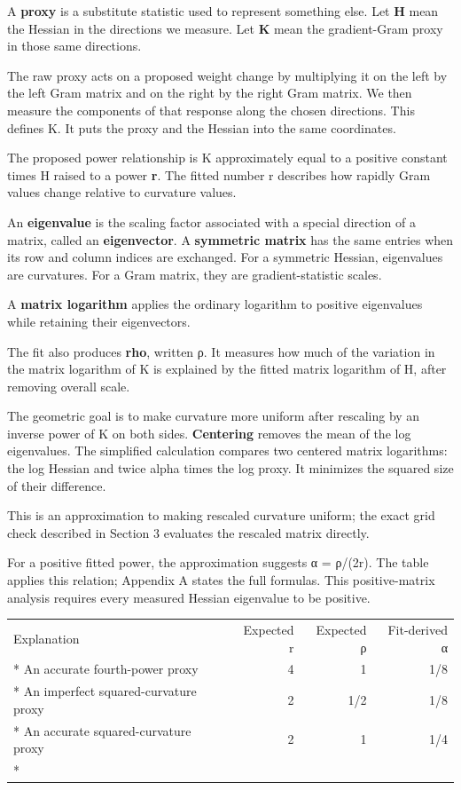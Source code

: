 \documentclass[
  14pt,
  letterpaper,
]{extarticle}
\newcounter{none} %
\begin{document}
A \textbf{proxy} is a substitute statistic used to represent something
else. Let \textbf{H} mean the Hessian in the directions we measure. Let
\textbf{K} mean the gradient-Gram proxy in those same directions.

The raw proxy acts on a proposed weight change by multiplying it on the
left by the left Gram matrix and on the right by the right Gram matrix.
We then measure the components of that response along the chosen
directions. This defines K. It puts the proxy and the Hessian into the
same coordinates.

The proposed power relationship is K approximately equal to a positive
constant times H raised to a power \textbf{r}. The fitted number r
describes how rapidly Gram values change relative to curvature values.

An \textbf{eigenvalue} is the scaling factor associated with a special
direction of a matrix, called an \textbf{eigenvector}. A
\textbf{symmetric matrix} has the same entries when its row and column
indices are exchanged. For a symmetric Hessian, eigenvalues are
curvatures. For a Gram matrix, they are gradient-statistic scales.

A \textbf{matrix logarithm} applies the ordinary logarithm to positive
eigenvalues while retaining their eigenvectors.

The fit also produces \textbf{rho}, written ρ. It measures how much of
the variation in the matrix logarithm of K is explained by the fitted
matrix logarithm of H, after removing overall scale.

The geometric goal is to make curvature more uniform after rescaling by
an inverse power of K on both sides. \textbf{Centering} removes the mean
of the log eigenvalues. The simplified calculation compares two centered
matrix logarithms: the log Hessian and twice alpha times the log proxy.
It minimizes the squared size of their difference.

This is an approximation to making rescaled curvature uniform; the exact
grid check described in Section 3 evaluates the rescaled matrix
directly.

For a positive fitted power, the approximation suggests α = ρ/(2r). The
table applies this relation; Appendix A states the full formulas. This
positive-matrix analysis requires every measured Hessian eigenvalue to
be positive.

{\def\LTcaptype{none} %
\begin{longtable}[]{@{}lrrr@{}}
\toprule\noalign{}
Explanation & Expected r & Expected ρ & Fit-derived α \\*
\midrule\noalign{}
\endhead
\bottomrule\noalign{}
\endlastfoot
An accurate fourth-power proxy & 4 & 1 & 1/8 \\*
An imperfect squared-curvature proxy & 2 & 1/2 & 1/8 \\*
An accurate squared-curvature proxy & 2 & 1 & 1/4 \\*
\end{longtable}
}
\end{document}
